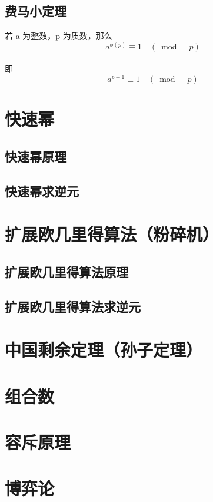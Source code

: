 \documentclass[]{book}
\begin{document}
\section{费马小定理}
若 a 为整数，p 为质数，那么
\[a^{\phi(p)}\equiv 1 \quad(\bmod \quad p)\]\\即
\[a^{p-1}\equiv 1 \quad(\bmod \quad p)\]
\chapter{快速幂}
\section{快速幂原理}
\section{快速幂求逆元}

\chapter{扩展欧几里得算法（粉碎机）}
\section{扩展欧几里得算法原理}
\section{扩展欧几里得算法求逆元}

\chapter{中国剩余定理（孙子定理）}

\chapter{组合数}

\chapter{容斥原理}

\chapter{博弈论}
\end{document}
